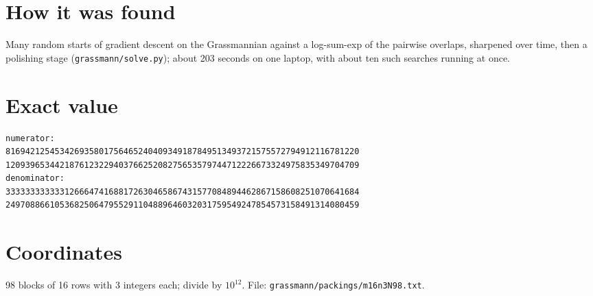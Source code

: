 \documentclass[11pt,a4paper]{article}
\begin{document}
\section{How it was found}
Many random starts of gradient descent on the Grassmannian against a log-sum-exp of the pairwise overlaps, sharpened over time, then a polishing stage (\texttt{grassmann/solve.py}); about 203 seconds on one laptop, with about ten such searches running at once.


\appendix
\section{Exact value}
{\small
\begin{verbatim}
numerator:
816942125453426935801756465240409349187849513493721575572794912116781220
120939653442187612322940376625208275653579744712226673324975835349704709
denominator:
333333333333126664741688172630465867431577084894462867158608251070641684
249708866105368250647955291104889646032031759549247854573158491314080459
\end{verbatim}}

\section{Coordinates}
98 blocks of 16 rows with 3 integers each; divide by $10^{12}$. File: \texttt{grassmann/packings/m16n3N98.txt}.
{\tiny
\begin{multicols}{3}
\end{multicols}}
\end{document}
